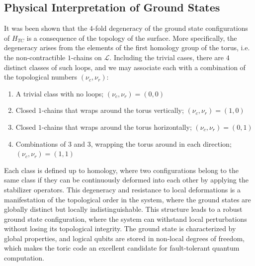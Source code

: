 \documentclass[12pt]{article}
\theoremstyle{definition}
\begin{document}
\subsection{Physical Interpretation of Ground States}
It was been shown that the $4$-fold degeneracy of the ground state configurations of $H_{TC}$ is a consequence of the topology of the surface. More specifically, the degeneracy arises from the elements of the first homology group of the torus, i.e. the non-contractible $1$-chains on $\mathcal{L}$. Including the trivial cases, there are $4$ distinct classes of such loops, and we may associate each with a combination of the topological numbers $(\nu_c,\nu_r)$:
    \begin{enumerate}
        \item A trivial class with no loops; $(\nu_c,\nu_r) = (0,0)$
        \item Closed $1$-chains that wraps around the torus vertically; $(\nu_c,\nu_r) = (1,0)$
        \item Closed $1$-chains that wraps around the torus horizontally; $(\nu_c,\nu_r) = (0,1)$
        \item Combinations of $3$ and $3$, wrapping the torus around in each direction; $(\nu_c,\nu_r) = (1,1)$
    \end{enumerate}
Each class is defined up to homology, where two configurations belong to the same class if they can be continuously deformed into each other by applying the stabilizer operators. This degeneracy and resistance to local deformations is a manifestation of the topological order in the system, where the ground states are globally distinct but locally indistinguishable. This structure leads to a robust ground state configuration, where the system can withstand local perturbations without losing its topological integrity. The ground state is characterized by global properties, and logical qubits are stored in non-local degrees of freedom, which makes the toric code an excellent candidate for fault-tolerant quantum computation.
\end{document}
